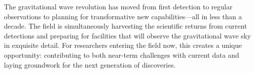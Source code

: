 The gravitational wave revolution has moved from first detection to regular observations to planning for transformative new capabilities—all in less than a decade.
The field is simultaneously harvesting the scientific returns from current detections and preparing for facilities that will observe the gravitational wave sky in exquisite detail.
For researchers entering the field now, this creates a unique opportunity: contributing to both near-term challenges with current data and laying groundwork for the next generation of discoveries.


